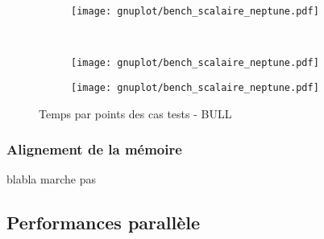 \begin{figure}[h!]
  \centering
  \begin{subfigure}[b]{0.5\textwidth}
    \centering
    \texttt{[image: gnuplot/bench\_scalaire\_neptune.pdf]}
  \caption{\label{fig:bench_scal_neptune_nonper}}
  \end{subfigure}%
  ~
  \begin{subfigure}[b]{0.5\textwidth}
    \centering
    \texttt{[image: gnuplot/bench\_scalaire\_neptune.pdf]}
  \caption{\label{fig:bench_scal_neptune_sym}}
  \end{subfigure}
  \begin{subfigure}[b]{0.5\textwidth}
    \centering
    \texttt{[image: gnuplot/bench\_scalaire\_neptune.pdf]}
  \caption{\label{fig:bench_scal_neptune_per}}
  \end{subfigure}
  \caption{\label{fig:bench_scal_neptune}Temps par points des cas tests - BULL}
\end{figure}




\subsubsection{Alignement de la mémoire}
blabla marche pas



\subsection{Performances parallèle}






